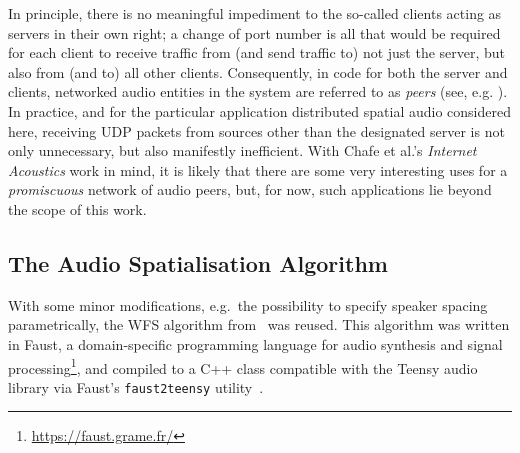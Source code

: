 In principle, there is no meaningful impediment to the so-called
clients acting as servers in their own right; a change of port number is all
that would be required for each client to receive traffic from (and send
traffic to) not just the server, but also from (and to) all other clients.
Consequently, in code for both the server and clients, networked audio entities
in the system are referred to as \textit{peers} (see, e.g.
).
In practice, and for the particular application
\textemdash{} distributed spatial audio \textemdash{}
considered here, receiving UDP packets from sources other than the designated
server is not only unnecessary, but also manifestly inefficient.
With Chafe et al.'s \textit{Internet Acoustics} work in mind, it is likely that
there are some very interesting uses for a \textit{promiscuous} network
of audio peers, but, for now, such applications lie beyond the scope of this
work.


\subsection{The Audio Spatialisation Algorithm}\label{subsec:wfs-algorithm}

With some minor modifications, e.g.\ the possibility to specify speaker spacing
parametrically, the WFS algorithm
from~\citep{rushton_microcontroller-based_2023} was reused.
This algorithm was written in Faust, a domain-specific programming language
for audio synthesis and signal processing\footnote{
    \url{https://faust.grame.fr/}
}, and compiled to
a C++ class compatible with the Teensy audio library via Faust's
\texttt{faust2teensy} utility~\citep{michon_real_2019}.


